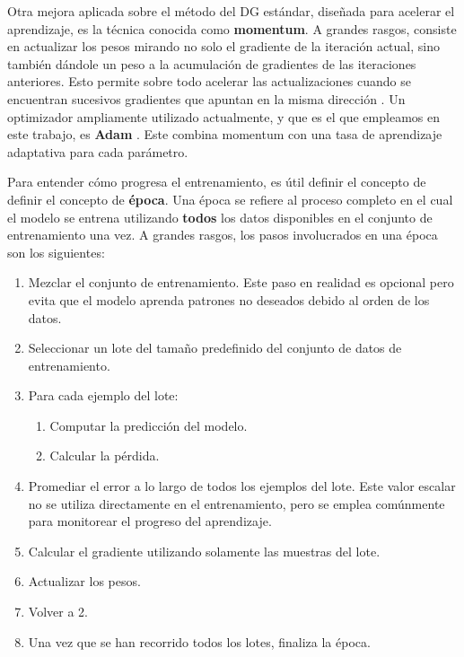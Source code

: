 \documentclass[../../main.tex]{subfiles}
\begin{document}
Otra mejora aplicada sobre el método del DG estándar, diseñada para acelerar el
aprendizaje, es la técnica conocida como \textbf{momentum}. A grandes rasgos, consiste en
actualizar los pesos mirando no solo el gradiente de la iteración actual, sino también
dándole un peso a la acumulación de gradientes de las iteraciones anteriores. Esto permite
sobre todo acelerar las actualizaciones cuando se encuentran sucesivos gradientes que
apuntan en la misma dirección \cite{deep-learning}. Un optimizador ampliamente utilizado
actualmente, y que es el que empleamos en este trabajo, es \textbf{Adam} \cite{adampaper}.
Este combina momentum con una tasa de aprendizaje adaptativa para cada parámetro.

Para entender cómo progresa el entrenamiento, es útil definir el concepto de definir el
concepto de \textbf{época}. Una época se refiere al proceso completo en el cual el modelo
se entrena utilizando \textbf{todos} los datos disponibles en el conjunto de entrenamiento
una vez. A grandes rasgos, los pasos involucrados en una época son los siguientes:
\begin{enumerate}[itemsep=0.05cm,label=\textbf{\arabic*.}]
    \item Mezclar el conjunto de entrenamiento. Este paso en realidad es opcional
    pero evita que el modelo aprenda patrones no deseados debido al orden de los datos.
    \item Seleccionar un lote del tamaño predefinido del conjunto de datos de entrenamiento.
    \item Para cada ejemplo del lote:
    \vspace{-0.2cm}
    \begin{enumerate}[noitemsep]
        \item Computar la predicción del modelo.
        \item Calcular la pérdida.
    \end{enumerate}
    \item Promediar el error a lo largo de todos los ejemplos del lote. Este valor escalar
    no se utiliza directamente en el entrenamiento, pero se emplea comúnmente para
    monitorear el progreso del aprendizaje.
    \item Calcular el gradiente utilizando solamente las muestras del lote.
    \item Actualizar los pesos.
    \item Volver a 2.
    \item Una vez que se han recorrido todos los lotes, finaliza la época.
\end{enumerate}
\end{document}
